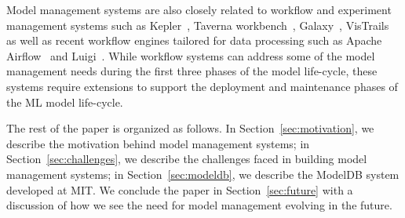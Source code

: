 \documentclass[11pt]{article}
\newcommand{\mlwfs}{ML workflows\xspace}
\newcommand{\mdb}{{\sc ModelDB}\xspace}
\newcommand{\wf}{workflow\xspace}
\newcommand{\wfs}{workflows\xspace}
\newcommand{\Dss}{Data scientists\xspace}
\newcommand{\dss}{data scientists\xspace}
\newcommand{\mldevs}{ML developers\xspace}
\begin{document}
Model management systems are also closely related to workflow and experiment management systems such as Kepler~\cite{kepler}, Taverna workbench~\cite{taverna},
Galaxy~\cite{galaxy}, VisTrails~\cite{bavoil2005vistrails, callahan2006vistrails, callahan2006workflows} as well as recent workflow engines tailored for data processing such as Apache Airflow~\cite{airflow} and
Luigi~\cite{luigi}.
While workflow systems can address some of the model management needs during the first three phases of the model life-cycle, these systems require extensions to support the deployment and maintenance phases of the ML model life-cycle.



The rest of the paper is organized as follows.
In Section~\ref{sec:motivation}, we describe the motivation behind model management systems; in Section~\ref{sec:challenges}, we describe the challenges faced in building model management systems; in Section~\ref{sec:modeldb}, we describe the \mdb system developed at MIT.
We conclude the paper in Section~\ref{sec:future} with a discussion of how we see the need for model management evolving in the future.
\end{document}
